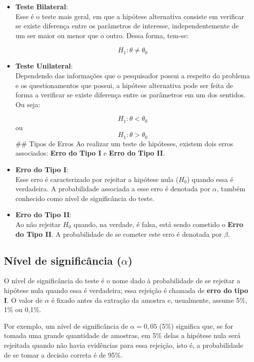 \documentclass[
]{estat/estat}
\begin{document}
\begin{itemize}
\item
  \textbf{Teste Bilateral}:\\
  Esse é o teste mais geral, em que a hipótese alternativa consiste em
  verificar se existe diferença entre os parâmetros de interesse,
  independentemente de um ser maior ou menor que o outro. Dessa forma,
  tem-se:

  \[ H_{1}: \theta \neq \theta_{0} \]
\item
  \textbf{Teste Unilateral}:\\
  Dependendo das informações que o pesquisador possui a respeito do
  problema e os questionamentos que possui, a hipótese alternativa pode
  ser feita de forma a verificar se existe diferença entre os parâmetros
  em um dos sentidos. Ou seja:

  \[ H_{1}: \theta < \theta_{0} \] ou \[ H_{1}: \theta > \theta_{0} \]
  \#\# Tipos de Erros Ao realizar um teste de hipóteses, existem dois
  erros associados: \textbf{Erro do Tipo I} e \textbf{Erro do Tipo II}.
\item
  \textbf{Erro do Tipo I}:\\
  Esse erro é caracterizado por rejeitar a hipótese nula (\(H_{0}\))
  quando essa é verdadeira. A probabilidade associada a esse erro é
  denotada por \(\alpha\), também conhecido como nível de significância
  do teste.
\item
  \textbf{Erro do Tipo II}:\\
  Ao não rejeitar \(H_{0}\) quando, na verdade, é falsa, está sendo
  cometido o \textbf{Erro do Tipo II}. A probabilidade de se cometer
  este erro é denotada por \(\beta\).
\end{itemize}

\subsection{\texorpdfstring{Nível de significância
(\(\alpha\))}{Nível de significância (\textbackslash alpha)}}\label{nuxedvel-de-significuxe2ncia-alpha}

O nível de significância do teste é o nome dado à probabilidade de se
rejeitar a hipótese nula quando essa é verdadeira; essa rejeição é
chamada de \textbf{erro do tipo I}. O valor de \(\alpha\) é fixado antes
da extração da amostra e, usualmente, assume 5\%, 1\% ou 0,1\%.

Por exemplo, um nível de significância de \(\alpha=0,05\) (5\%)
significa que, se for tomada uma grande quantidade de amostras, em 5\%
delas a hipótese nula será rejeitada quando não havia evidências para
essa rejeição, isto é, a probabilidade de se tomar a decisão correta é
de 95\%.
\end{document}
